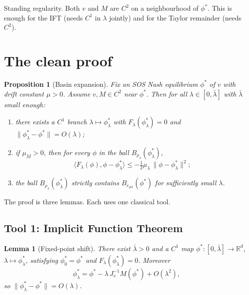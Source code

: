 \documentclass[11pt]{article}
\newtheorem{proposition}{Proposition}
\newtheorem{lemma}{Lemma}
\newcommand{\R}{\mathbb{R}}
\begin{document}
Standing regularity. Both $v$ and $M$ are $C^2$ on a neighbourhood of $\phi^*$. This is enough for the IFT (needs $C^1$ in $\lambda$ jointly) and for the Taylor remainder (needs $C^2$).

\section{The clean proof}\label{sec:proof}

\begin{proposition}[Basin expansion]
Fix an SOS Nash equilibrium $\phi^*$ of $v$ with drift constant $\mu > 0$. Assume $v, M \in C^2$ near $\phi^*$. Then for all $\lambda \in [0, \bar\lambda]$ with $\bar\lambda$ small enough:
\begin{enumerate}[label=(\roman*)]
\item there exists a $C^1$ branch $\lambda \mapsto \phi^*_\lambda$ with $F_\lambda(\phi^*_\lambda) = 0$ and $\|\phi^*_\lambda - \phi^*\| = O(\lambda)$;
\item if $\mu_M > 0$, then for every $\phi$ in the ball $B_{\rho_\lambda}(\phi^*_\lambda)$,
\[
\langle F_\lambda(\phi), \phi - \phi^*_\lambda\rangle \le -\tfrac{1}{2} \mu_\lambda\, \|\phi - \phi^*_\lambda\|^2;
\]
\item the ball $B_{\rho_\lambda}(\phi^*_\lambda)$ strictly contains $B_{r_{\mathrm{att}}}(\phi^*)$ for sufficiently small $\lambda$.
\end{enumerate}
\end{proposition}

The proof is three lemmas. Each uses one classical tool.

\subsection{Tool 1: Implicit Function Theorem}

\begin{lemma}[Fixed-point shift]\label{lem:shift}
There exist $\bar\lambda > 0$ and a $C^1$ map $\phi^* : [0,\bar\lambda] \to \R^d$, $\lambda \mapsto \phi^*_\lambda$, satisfying $\phi^*_0 = \phi^*$ and $F_\lambda(\phi^*_\lambda) = 0$. Moreover
\[
\phi^*_\lambda = \phi^* - \lambda\, J_v^{-1} M(\phi^*) + O(\lambda^2),
\]
so $\|\phi^*_\lambda - \phi^*\| = O(\lambda)$.
\end{lemma}
\end{document}
